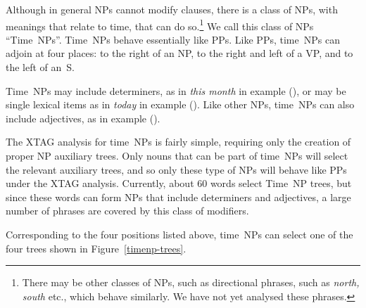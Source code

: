 

Although in general NPs cannot modify clauses, there is a class of
NPs, with meanings that relate to time, that can do so.\footnote{
  There may be other classes of NPs, such as directional phrases, such
  as {\em north, south} etc., which behave similarly. We have not yet
  analysed these phrases.} We call this class of NPs ``Time~NPs''.
Time~NPs behave essentially like PPs. Like PPs, time~NPs can adjoin at
four places: to the right of an NP, to the right and left of a VP, and
to the left of an~S.

Time~NPs may include determiners, as in {\em this month} in example
(), or may be single lexical items as in {\em today} in example
().  Like other NPs, time~NPs can also include adjectives, as in
example ().


The XTAG analysis for time~NPs is fairly simple, requiring only the
creation of proper NP auxiliary trees.  Only nouns that can be part of
time~NPs will select the relevant auxiliary trees, and so only these
type of NPs will behave like PPs under the XTAG analysis.
Currently, about 60 words select Time~NP trees, but since these
words can form NPs that include determiners and adjectives, a large
number of phrases are covered by this class of modifiers.

Corresponding to the four positions listed above, time~NPs
can select one of the four trees shown in Figure~\ref{timenp-trees}.

